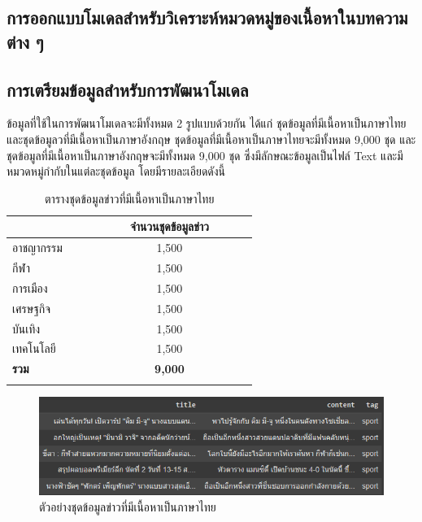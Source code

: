 \documentclass[12pt,oneside,openright,a4paper]{cpe-thai-project}
\begin{document}
\begin{itemize}
  \section{การออกแบบโมเดลสำหรับวิเคราะห์หมวดหมู่ของเนื้อหาในบทความต่าง ๆ}
    \subsection{การเตรียมข้อมูลสำหรับการพัฒนาโมเดล}
      \hspace{1cm}ข้อมูลที่ใช้ในการพัฒนาโมเดลจะมีทั้งหมด 2 รูปแบบด้วยกัน ได้แก่ ชุดข้อมูลที่มีเนื้อหาเป็นภาษาไทยและชุดข้อมูลวที่มีเนื้อหาเป็นภาษาอังกฤษ
      ชุดข้อมูลที่มีเนื้อหาเป็นภาษาไทยจะมีทั้งหมด 9,000 ชุด และชุดข้อมูลที่มีเนื้อหาเป็นภาษาอังกฤษจะมีทั้งหมด 9,000 ชุด ซึ่งมีลักษณะข้อมูลเป็นไฟล์ Text
      และมีหมวดหมู่กำกับในแต่ละชุดข้อมูล โดยมีรายละเอียดดังนี้

      \begin{longtable}[!ht]{p{0.15\linewidth}m{0.45\linewidth}}
        \caption{ตารางชุดข้อมูลข่าวที่มีเนื้อหาเป็นภาษาไทย}
        \label{tbl:new_th}\\
        \hhline{==}
        \multicolumn{1}{c}{\textbf{หมวดหมู่}} & \multicolumn{1}{c}{\textbf{จำนวนชุดข้อมูลข่าว}} \\ \hline
        \endhead
        อาชญากรรม                              & \multicolumn{1}{c}{1,500}                        \\ %
        กีฬา                                   & \multicolumn{1}{c}{1,500}                         \\ %
        การเมือง                               & \multicolumn{1}{c}{1,500}                          \\ %
        เศรษฐกิจ                                 & \multicolumn{1}{c}{1,500}                          \\ %
        บันเทิง                                & \multicolumn{1}{c}{1,500}                          \\ %
        เทคโนโลยี                              & \multicolumn{1}{c}{1,500}                          \\ \hline
        \textbf{รวม}                           & \multicolumn{1}{c}{\textbf{9,000}}                        \\ \hhline{==}
      \end{longtable}

      \begin{figure}[!ht]\centering
        \includegraphics[width=13cm]{./img/news_th.png}
        \caption{ตัวอย่างชุดข้อมูลข่าวที่มีเนื้อหาเป็นภาษาไทย}\label{fig:new_th}
      \end{figure}


\end{itemize}
\end{document}
